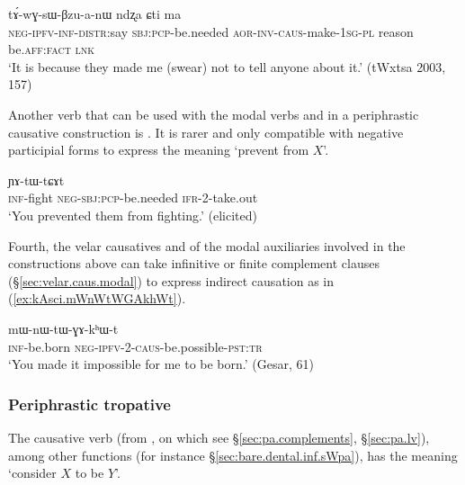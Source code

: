  \begin{exe}
\ex  \label{ex:kWra.tAwGsWBzuanW}
\gll [mɯ-tu-kɤ-nɤtɯti kɯ-ra] tɤ́-wɣ-sɯ-βzu-a-nɯ ndʐa ɕti ma  \\
\textsc{neg}-\textsc{ipfv}-\textsc{inf}-\textsc{distr}:say \textsc{sbj}:\textsc{pcp}-be.needed \textsc{aor}-\textsc{inv}-\textsc{caus}-make-\textsc{1sg}-\textsc{pl} reason be.\textsc{aff}:\textsc{fact} \textsc{lnk} \\ 
\glt `It is because they made me (swear) not to tell anyone about it.'  (tWxtsa 2003, 157)
\end{exe}

Another verb that can be used with the modal verbs  and  in a periphrastic causative construction is . It is rarer and only compatible with negative participial forms to express the meaning `prevent from $X$'.

\begin{exe}
\ex  \label{ex:mAkWra.YAtWtCAt}
\gll  [kɤ-ɤlɯlɤt mɤ-kɯ-ra] ɲɤ-tɯ-tɕɤt \\
\textsc{inf}-fight \textsc{neg}-\textsc{sbj}:\textsc{pcp}-be.needed \textsc{ifr}-2-take.out \\
\glt `You prevented them from fighting.' (elicited)
\end{exe}
 
 Fourth, the velar causatives   and   of the modal auxiliaries involved in the constructions above can take infinitive or finite complement clauses (§\ref{sec:velar.caus.modal}) to express indirect causation as in (\ref{ex:kAsci.mWnWtWGAkhWt}).

\begin{exe}
\ex \label{ex:kAsci.mWnWtWGAkhWt}
\gll   [kɤ-sci] mɯ-nɯ-tɯ-ɣɤ-kʰɯ-t  \\
\textsc{inf}-be.born \textsc{neg}-\textsc{ipfv}-2-\textsc{caus}-be.possible-\textsc{pst}:\textsc{tr} \\
\glt `You made it impossible for me to be born.' (Gesar, 61)
\end{exe}  

\subsubsection{Periphrastic tropative} \label{sec:tropative.sWpa}
The causative verb  (from , on which see
§\ref{sec:pa.complements}, §\ref{sec:pa.lv}), among other functions (for instance §\ref{sec:bare.dental.inf.sWpa}), has the meaning `consider $X$ to be $Y$'.

